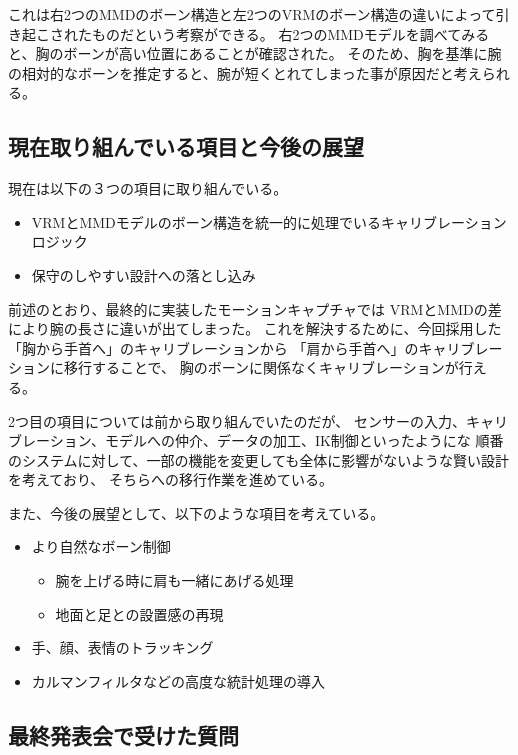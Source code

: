 \documentclass[a4j]{jsarticle}
\begin{document}
これは右2つのMMDのボーン構造と左2つのVRMのボーン構造の違いによって引き起こされたものだという考察ができる。
右2つのMMDモデルを調べてみると、胸のボーンが高い位置にあることが確認された。
そのため、胸を基準に腕の相対的なボーンを推定すると、腕が短くとれてしまった事が原因だと考えられる。

\subsection{現在取り組んでいる項目と今後の展望}

現在は以下の３つの項目に取り組んでいる。

\begin{itemize}
  \item VRMとMMDモデルのボーン構造を統一的に処理でいるキャリブレーションロジック
  \item 保守のしやすい設計への落とし込み
\end{itemize}

前述のとおり、最終的に実装したモーションキャプチャでは
VRMとMMDの差により腕の長さに違いが出てしまった。
これを解決するために、今回採用した「胸から手首へ」のキャリブレーションから
「肩から手首へ」のキャリブレーションに移行することで、
胸のボーンに関係なくキャリブレーションが行える。

2つ目の項目については前から取り組んでいたのだが、
センサーの入力、キャリブレーション、モデルへの仲介、データの加工、IK制御といったようにな
順番のシステムに対して、一部の機能を変更しても全体に影響がないような賢い設計を考えており、
そちらへの移行作業を進めている。

また、今後の展望として、以下のような項目を考えている。

\begin{itemize}
  \item より自然なボーン制御
  \begin{itemize}
    \item 腕を上げる時に肩も一緒にあげる処理
    \item 地面と足との設置感の再現
  \end{itemize}
  \item 手、顔、表情のトラッキング
  \item カルマンフィルタなどの高度な統計処理の導入
\end{itemize}

\subsection{最終発表会で受けた質問}
\end{document}
